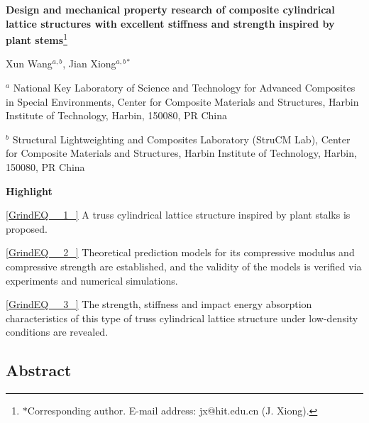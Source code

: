 \documentclass{article} %
\begin{document}


\noindent 

\noindent 

\noindent 

\noindent 

\noindent \textbf{Design and mechanical property research of composite cylindrical lattice structures with excellent stiffness and strength inspired by plant stems}\footnote{$\mathrm{\ast}$Corresponding author. E-mail address: jx@hit.edu.cn (J. Xiong).}

\noindent Xun Wang${}^{a,b}$, Jian Xiong${}^{a,b}$${}^{\mathrm{\ast }}$

\noindent ${}^{a}$ National Key Laboratory of Science and Technology for Advanced Composites in Special Environments, Center for Composite Materials and Structures, Harbin Institute of Technology, Harbin, 150080, PR China

\noindent ${}^{b}$ Structural Lightweighting and Composites Laboratory (StruCM Lab), Center for Composite Materials and Structures, Harbin Institute of Technology, Harbin, 150080, PR China

\noindent \textbf{Highlight}

\eqref{GrindEQ__1_} A truss cylindrical lattice structure inspired by plant stalks is proposed.

\eqref{GrindEQ__2_} Theoretical prediction models for its compressive modulus and compressive strength are established, and the validity of the models is verified via experiments and numerical simulations.

\eqref{GrindEQ__3_} The strength, stiffness and impact energy absorption characteristics of this type of truss cylindrical lattice structure under low-density conditions are revealed.

\noindent 
\subsection{Abstract}
\end{document}

